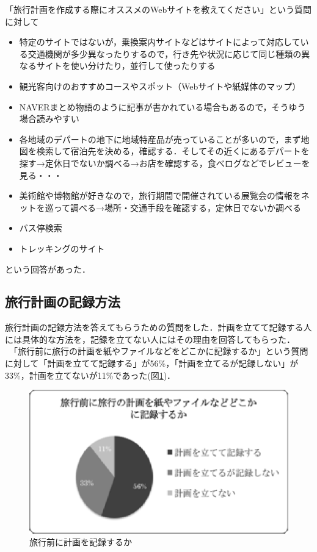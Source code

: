 \documentclass{funthesis}
\begin{document}
「旅行計画を作成する際にオススメのWebサイトを教えてください」という質問に対して
\begin{itemize}
 \item 特定のサイトではないが，乗換案内サイトなどはサイトによって対応している交通機関が多少異なったりするので，行き先や状況に応じて同じ種類の異なるサイトを使い分けたり，並行して使ったりする
 \item 観光客向けのおすすめコースやスポット（Webサイトや紙媒体のマップ）
 \item NAVERまとめ物語のように記事が書かれている場合もあるので，そうゆう場合読みやすい
 \item 各地域のデパートの地下に地域特産品が売っていることが多いので，まず地図を検索して宿泊先を決める，確認する．そしてその近くにあるデパートを探す→定休日でないか調べる→お店を確認する，食べログなどでレビューを見る・・・
 \item 美術館や博物館が好きなので，旅行期間で開催されている展覧会の情報をネットを巡って調べる→場所・交通手段を確認する，定休日でないか調べる
 \item バス停検索
 \item トレッキングのサイト
\end{itemize}
という回答があった．


\subsection{旅行計画の記録方法}

旅行計画の記録方法を答えてもらうための質問をした．計画を立てて記録する人には具体的な方法を，記録を立てない人にはその理由を回答してもらった．\\
　「旅行前に旅行の計画を紙やファイルなどをどこかに記録するか」という質問に対して「計画を立てて記録する」が56\%，「計画を立てるが記録しない」が33\%，計画を立てないが11\%であった(図\ref{Lfilerecord})．

\begin{figure}[htpb]
\begin{center}
\includegraphics[scale=0.65]{filerecord.eps}
\end{center}
\caption{旅行前に計画を記録するか}
\label{Lfilerecord}
\end{figure}
\end{document}
